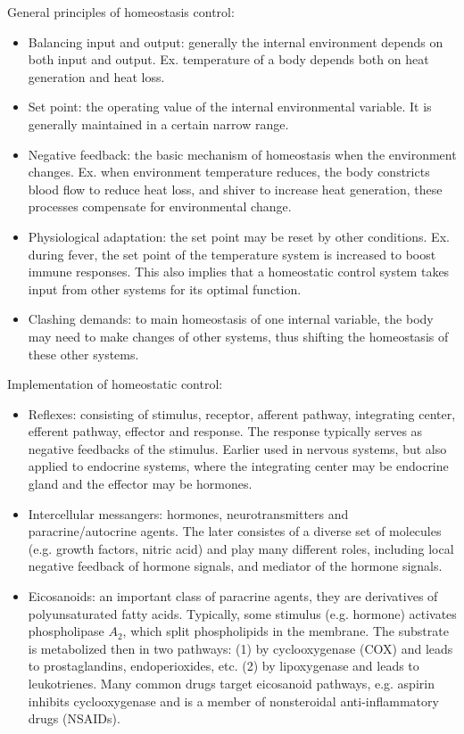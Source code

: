 \documentclass{report}
\begin{document}
\begin{enumerate}
General principles of homeostasis control: 
\begin{itemize}
\item Balancing input and output: generally the internal environment depends on both input and output. Ex. temperature of a body depends both on heat generation and heat loss. 
\item Set point: the operating value of the internal environmental variable. It is generally maintained in a certain narrow range. 
\item Negative feedback: the basic mechanism of homeostasis when the environment changes. Ex. when environment temperature reduces, the body constricts blood flow to reduce heat loss, and shiver to increase heat generation, these processes compensate for environmental change. 
\item Physiological adaptation: the set point may be reset by other conditions. Ex. during fever, the set point of the temperature system is increased to boost immune responses. This also implies that a homeostatic control system takes input from other systems for its optimal function. 
\item Clashing demands: to main homeostasis of one internal variable, the body may need to make changes of other systems, thus shifting the homeostasis of these other systems. 
\end{itemize}

Implementation of homeostatic control: 
\begin{itemize}
\item Reflexes: consisting of stimulus, receptor, afferent pathway, integrating center, efferent pathway, effector and response. The response typically serves as negative feedbacks of the stimulus. Earlier used in nervous systems, but also applied to endocrine systems, where the integrating center may be endocrine gland and the effector may be hormones. 

\item Intercellular messangers: hormones, neurotransmitters and paracrine/autocrine agents. The later consistes of a diverse set of molecules (e.g. growth factors, nitric acid) and play many different roles, including local negative feedback of hormone signals, and mediator of the hormone signals. 

\item Eicosanoids: an important class of paracrine agents, they are derivatives of polyunsaturated fatty acids. Typically, some stimulus (e.g. hormone) activates phospholipase $A_2$, which split phospholipids in the membrane. The substrate is metabolized then in two pathways: (1) by cyclooxygenase (COX) and leads to prostaglandins, endoperioxides, etc. (2) by lipoxygenase and leads to leukotrienes. Many common drugs target eicosanoid pathways, e.g. aspirin inhibits cyclooxygenase and is a member of nonsteroidal anti-inflammatory drugs (NSAIDs). 
\end{itemize}


\end{enumerate}
\end{document}
